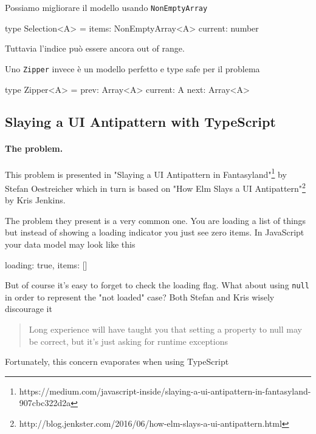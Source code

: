 \documentclass[12pt]{article}
\theoremstyle{definition}
\newenvironment{code}
  {\vspace{0.5cm} \VerbatimEnvironment\begin{typescriptcode}}
  {\end{typescriptcode} \vspace{0.2cm}}
\begin{document}
Possiamo migliorare il modello usando \texttt{NonEmptyArray}

\begin{code}
type Selection<A> = {
  items: NonEmptyArray<A>
  current: number
}
\end{code}

Tuttavia l'indice può essere ancora out of range.

Uno \texttt{Zipper} invece è un modello perfetto e type safe per il problema

\begin{code}
type Zipper<A> = {
  prev: Array<A>
  current: A
  next: Array<A>
}
\end{code}

\newpage
\subsection{Slaying a UI Antipattern with TypeScript}

\paragraph{The problem.}

This problem is presented in "Slaying a UI Antipattern in Fantasyland"\footnote{https://medium.com/javascript-inside/slaying-a-ui-antipattern-in-fantasyland-907cbc322d2a}
by Stefan Oestreicher which in turn is based on "How Elm Slays a UI Antipattern"\footnote{http://blog.jenkster.com/2016/06/how-elm-slays-a-ui-antipattern.html}
by Kris Jenkins.

The problem they present is a very common one. You are loading a list of things but instead of showing a loading indicator
you just see zero items. In JavaScript your data model may look like this

\begin{code}
{
  loading: true,
  items: []
}
\end{code}

But of course it's easy to forget to check the loading flag. What about using \texttt{null} in order to represent the "not loaded" case?
Both Stefan and Kris wisely discourage it

\begin{quote}
Long experience will have taught you that setting a property to null may be correct, but it's just asking for runtime exceptions
\end{quote}

Fortunately, this concern evaporates when using TypeScript
\end{document}

